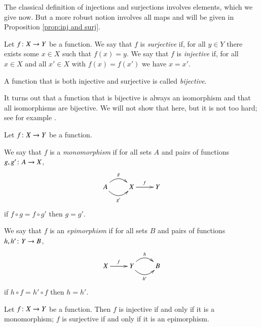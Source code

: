 The classical definition of injections and surjections involves elements, which we give now. But a more robust notion involves all maps and will be given in Proposition \ref{prop:inj and surj}.

\begin{definition}\label{def:inj,surj,bij}

Let $f\colon X\rightarrow Y$ be a function. We say that $f$ is {\em surjective} if, for all $y\in Y$ there exists some $x\in X$ such that $f(x)=y$. We say that $f$ is {\em injective} if, for all $x\in X$ and all $x'\in X$ with $f(x)=f(x')$ we have $x=x'$.

A function that is both injective and surjective is called {\em bijective}.

\end{definition}

\begin{remark}

It turns out that a function that is bijective is always an isomorphism and that all isomorphisms are bijective. We will not show that here, but it is not too hard; see for example \cite[Theorem 5.4]{Big}.

\end{remark}

\begin{definition}\label{def:mono, epi in set}

Let $f\colon X\rightarrow Y$ be a function. 

We say that $f$ is a {\em monomorphism} if for all sets $A$ and pairs of functions $g,g'\colon A\rightarrow X$,
$$
\xymatrix{A\ar@/^1pc/[r]^g\ar@/_1pc/[r]_{g'}&X\ar[r]^f&Y}
$$
if $f\circ g=f\circ g'$ then $g=g'$.

We say that $f$ is an {\em epimorphism} if for all sets $B$ and pairs of functions $h,h'\colon Y\rightarrow B$, 
$$
\xymatrix{X\ar[r]^f&Y\ar@/^1pc/[r]^h\ar@/_1pc/[r]_{h'}&B}
$$
if $h\circ f=h'\circ f$ then $h=h'$.

\end{definition}

\begin{proposition}\label{prop:inj and surj}

Let $f\colon X\rightarrow Y$ be a function. Then $f$ is injective if and only if it is a monomorphism; $f$ is surjective if and only if it is an epimorphism.

\end{proposition}

